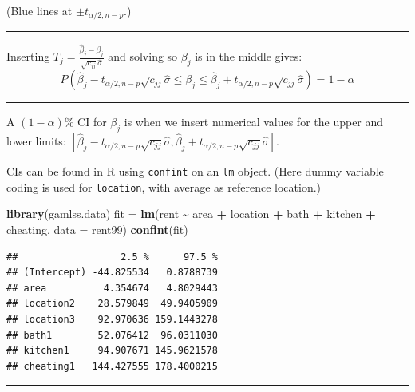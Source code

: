 \documentclass[
]{article}
\newenvironment{Shaded}{\begin{snugshade}}{\end{snugshade}}
\newcommand{\AttributeTok}[1]{\textcolor[rgb]{0.13,0.29,0.53}{#1}}
\newcommand{\FunctionTok}[1]{\textcolor[rgb]{0.13,0.29,0.53}{\textbf{#1}}}
\newcommand{\NormalTok}[1]{#1}
\newcommand{\OtherTok}[1]{\textcolor[rgb]{0.56,0.35,0.01}{#1}}
\newcommand{\SpecialCharTok}[1]{\textcolor[rgb]{0.81,0.36,0.00}{\textbf{#1}}}
\begin{document}
(Blue lines at \(\pm t_{\alpha/2,n-p}\).)

\begin{center}\rule{0.5\linewidth}{0.5pt}\end{center}

Inserting
\(T_j =\frac{\hat{\beta}_j-\beta_j}{\sqrt{c_{jj}}\hat{\sigma}}\) and
solving so \(\beta_j\) is in the middle gives:
\[ P(\hat{\beta}_j-t_{\alpha/2,n-p}\sqrt{c_{jj}}\hat{\sigma}
\le \beta_j \le \hat{\beta}_j+t_{\alpha/2,n-p}\sqrt{c_{jj}}\hat{\sigma})=1-\alpha\]

\begin{center}\rule{0.5\linewidth}{0.5pt}\end{center}

A \((1-\alpha)\)\% CI for \(\beta_j\) is when we insert numerical values
for the upper and lower limits:
\([\hat{\beta}_j-t_{\alpha/2,n-p}\sqrt{c_{jj}}\hat{\sigma},\hat{\beta}_j+t_{\alpha/2,n-p}\sqrt{c_{jj}}\hat{\sigma}]\).

CIs can be found in R using \texttt{confint} on an \texttt{lm} object.
(Here dummy variable coding is used for \texttt{location}, with average
as reference location.)

\small

\begin{Shaded}
\begin{Highlighting}[]
\FunctionTok{library}\NormalTok{(gamlss.data)}
\NormalTok{fit }\OtherTok{=} \FunctionTok{lm}\NormalTok{(rent }\SpecialCharTok{\textasciitilde{}}\NormalTok{ area }\SpecialCharTok{+}\NormalTok{ location }\SpecialCharTok{+}\NormalTok{ bath }\SpecialCharTok{+}\NormalTok{ kitchen }\SpecialCharTok{+}\NormalTok{ cheating, }\AttributeTok{data =}\NormalTok{ rent99)}
\FunctionTok{confint}\NormalTok{(fit)}
\end{Highlighting}
\end{Shaded}

\begin{verbatim}
##                  2.5 %      97.5 %
## (Intercept) -44.825534   0.8788739
## area          4.354674   4.8029443
## location2    28.579849  49.9405909
## location3    92.970636 159.1443278
## bath1        52.076412  96.0311030
## kitchen1     94.907671 145.9621578
## cheating1   144.427555 178.4000215
\end{verbatim}

\normalsize

\begin{center}\rule{0.5\linewidth}{0.5pt}\end{center}
\end{document}
